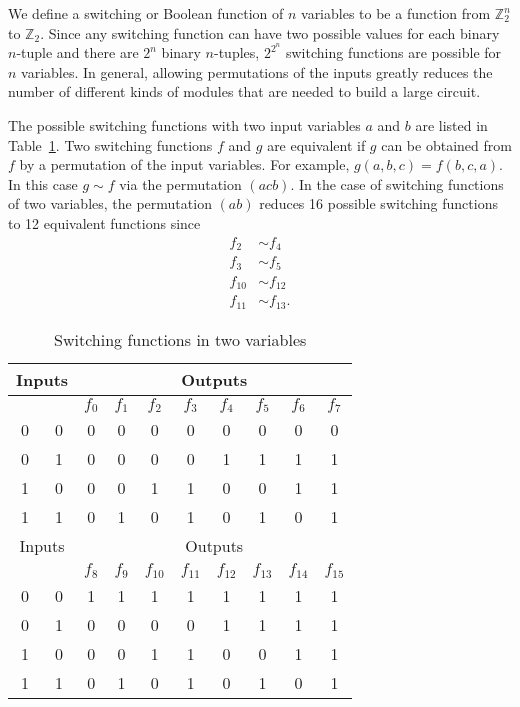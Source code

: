  
We define a {\bfi
switching\/} or
{\bfi Boolean
function\/} of $n$
variables to be a function from ${\mathbb Z}_2^n$ to ${\mathbb Z}_2$. Since 
any switching function can have two possible values for each binary
$n$-tuple and there are $2^n$ binary $n$-tuples, $2^{2^n}$ switching
functions are possible for $n$ variables. In general, allowing
permutations of the inputs greatly reduces the number of different
kinds of modules that are needed to build a large circuit.
 
 
The possible switching functions  with two input variables $a$ and
$b$ are listed in Table~\ref{switching_2variable}. Two switching functions $f$ and $g$
are equivalent if $g$ can be obtained from $f$ by a permutation of the
input variables. For example, $g(a, b, c) = f(b, c, a)$. In this 
case $g \sim f$ via the permutation $(acb)$. In the case of switching
functions of two variables, the permutation $(ab)$ reduces 16
possible switching functions to 12 equivalent functions since
\begin{align*}
f_2 & \sim  f_4 \\
f_3 & \sim  f_5 \\
f_{10} & \sim  f_{12} \\
f_{11} & \sim  f_{13}.
\end{align*}
 
 
\begin{table}[htb]
\caption{Switching functions in two variables}{\small
\medskip
\begin{center}
\begin{tabular}{|cc|cccccccc|}
\hline
\multicolumn{2}{|c|}{Inputs}
 & \multicolumn{8}{|c|}{Outputs}    \\
\hline
         &     & $f_0$ & $f_1$ & $f_2$ & $f_3$ & $f_4$ &
$f_5$ & $f_6$ & $f_7$  \\ \hline
0 & 0   & 0 & 0 & 0 & 0 & 0 & 0 & 0 & 0 \\
0 & 1   & 0 & 0 & 0 & 0 & 1 & 1 & 1 & 1 \\
1 & 0   & 0 & 0 & 1 & 1 & 0 & 0 & 1 & 1 \\
1 & 1   & 0 & 1 & 0 & 1 & 0 & 1 & 0 & 1 \\ \hline\hline
\multicolumn{2}{|c|}{Inputs}
 & \multicolumn{8}{|c|}{Outputs}    \\
\hline
         &     & $f_8$ & $f_9$ & $f_{10}$ & $f_{11}$
& $f_{12}$ & $f_{13}$ & $f_{14}$ & $f_{15}$ \\ \hline
0 & 0   & 1 & 1 & 1 & 1 & 1 & 1 & 1 & 1 \\
0 & 1   & 0 & 0 & 0 & 0 & 1 & 1 & 1 & 1 \\
1 & 0   & 0 & 0 & 1 & 1 & 0 & 0 & 1 & 1 \\
1 & 1   & 0 & 1 & 0 & 1 & 0 & 1 & 0 & 1 \\ \hline
\end{tabular}
\end{center}\label{switching_2variable}
}
\end{table}
 
